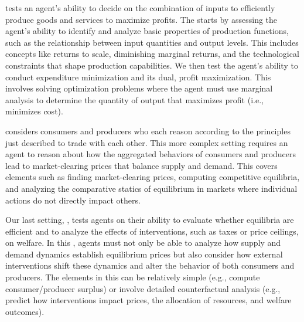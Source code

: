 \sixthParent tests an agent's ability to decide on the combination of inputs to efficiently produce goods and services to maximize profits. The \parent starts by assessing the agent's ability to identify and analyze basic properties of production functions, such as the relationship between input quantities and output levels. This includes concepts like returns to scale, diminishing marginal returns, and the technological constraints that shape production capabilities. We then test the agent's ability to conduct expenditure minimization and its dual, profit maximization. This involves solving optimization problems where the agent must use marginal analysis to determine the quantity of output that maximizes profit (i.e., minimizes cost).

\seventhParent considers consumers and producers who each reason according to the principles just described to trade with each other. This more complex setting requires an agent to reason about how the aggregated behaviors of consumers and producers lead to market-clearing prices that balance supply and demand. This \parent covers elements such as finding market-clearing prices, computing competitive equilibria, and analyzing the comparative statics of equilibrium in markets where individual actions do not directly impact others.

Our last setting, \eighthParent, tests agents on their ability to evaluate whether equilibria are efficient and to analyze the effects of interventions, such as taxes or price ceilings, on welfare. In this \parent, agents must not only be able to analyze how supply and demand dynamics establish equilibrium prices but also consider how external interventions shift these dynamics and alter the behavior of both consumers and producers. The elements in this \parent can be relatively simple (e.g., compute consumer/producer surplus) or involve detailed counterfactual analysis (e.g., predict how interventions impact prices, the allocation of resources, and welfare outcomes). 

